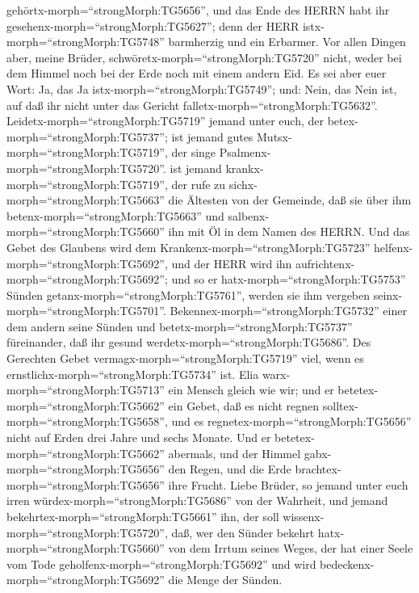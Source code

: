 gehörtx-morph=``strongMorph:TG5656'', und das Ende des HERRN habt ihr
gesehenx-morph=``strongMorph:TG5627''; denn der HERR
istx-morph=``strongMorph:TG5748'' barmherzig und ein Erbarmer.
 Vor allen Dingen aber, meine Brüder,
schwöretx-morph=``strongMorph:TG5720'' nicht, weder bei dem Himmel noch
bei der Erde noch mit einem andern Eid. Es sei aber euer Wort: Ja, das
Ja istx-morph=``strongMorph:TG5749''; und: Nein, das Nein ist, auf daß
ihr nicht unter das Gericht falletx-morph=``strongMorph:TG5632''.
 Leidetx-morph=``strongMorph:TG5719'' jemand unter euch,
der betex-morph=``strongMorph:TG5737''; ist jemand gutes
Mutsx-morph=``strongMorph:TG5719'', der singe
Psalmenx-morph=``strongMorph:TG5720''.  ist jemand
krankx-morph=``strongMorph:TG5719'', der rufe zu
sichx-morph=``strongMorph:TG5663'' die Ältesten von der Gemeinde, daß
sie über ihm betenx-morph=``strongMorph:TG5663'' und
salbenx-morph=``strongMorph:TG5660'' ihn mit Öl in dem Namen des HERRN.
 Und das Gebet des Glaubens wird dem
Krankenx-morph=``strongMorph:TG5723''
helfenx-morph=``strongMorph:TG5692'', und der HERR wird ihn
aufrichtenx-morph=``strongMorph:TG5692''; und so er
hatx-morph=``strongMorph:TG5753'' Sünden
getanx-morph=``strongMorph:TG5761'', werden sie ihm vergeben
seinx-morph=``strongMorph:TG5701''. 
Bekennex-morph=``strongMorph:TG5732'' einer dem andern seine Sünden und
betetx-morph=``strongMorph:TG5737'' füreinander, daß ihr gesund
werdetx-morph=``strongMorph:TG5686''. Des Gerechten Gebet
vermagx-morph=``strongMorph:TG5719'' viel, wenn es
ernstlichx-morph=``strongMorph:TG5734'' ist.  Elia
warx-morph=``strongMorph:TG5713'' ein Mensch gleich wie wir; und er
betetex-morph=``strongMorph:TG5662'' ein Gebet, daß es nicht regnen
solltex-morph=``strongMorph:TG5658'', und es
regnetex-morph=``strongMorph:TG5656'' nicht auf Erden drei Jahre und
sechs Monate.  Und er betetex-morph=``strongMorph:TG5662''
abermals, und der Himmel gabx-morph=``strongMorph:TG5656'' den Regen,
und die Erde brachtex-morph=``strongMorph:TG5656'' ihre Frucht.
 Liebe Brüder, so jemand unter euch irren
würdex-morph=``strongMorph:TG5686'' von der Wahrheit, und jemand
bekehrtex-morph=``strongMorph:TG5661'' ihn,  der soll
wissenx-morph=``strongMorph:TG5720'', daß, wer den Sünder bekehrt
hatx-morph=``strongMorph:TG5660'' von dem Irrtum seines Weges, der hat
einer Seele vom Tode geholfenx-morph=``strongMorph:TG5692'' und wird
bedeckenx-morph=``strongMorph:TG5692'' die Menge der Sünden.
